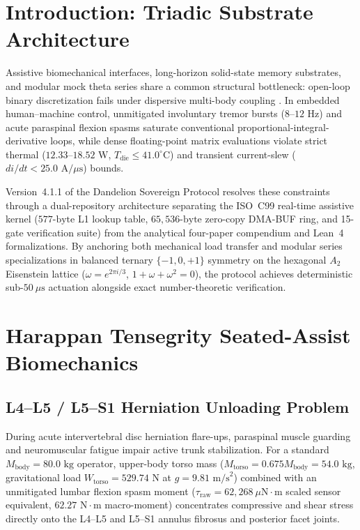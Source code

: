 \documentclass[aps,prl,twocolumn,superscriptaddress,10pt]{revtex4-2}
\begin{document}
\section{Introduction: Triadic Substrate Architecture}

Assistive biomechanical interfaces, long-horizon solid-state memory substrates, and modular mock theta series share a common structural bottleneck: open-loop binary discretization fails under dispersive multi-body coupling \cite{Landauer1961,Mori1965,Blume1966}. In embedded human--machine control, unmitigated involuntary tremor bursts ($8\text{--}12\text{ Hz}$) and acute paraspinal flexion spasms saturate conventional proportional-integral-derivative loops, while dense floating-point matrix evaluations violate strict thermal ($12.33\text{--}18.52\text{ W}$, $T_{\text{die}} \le 41.0^\circ\text{C}$) and transient current-slew ($di/dt < 25.0\text{ A}/\mu\text{s}$) bounds.

Version~4.1.1 of the Dandelion Sovereign Protocol resolves these constraints through a dual-repository architecture separating the ISO~C99 real-time assistive kernel ($577\text{-byte}$ L1 lookup table, $65,536\text{-byte}$ zero-copy DMA-BUF ring, and 15-gate verification suite) from the analytical four-paper compendium and Lean~4 formalizations. By anchoring both mechanical load transfer and modular series specializations in balanced ternary $\{-1, 0, +1\}$ symmetry on the hexagonal $A_2$ Eisenstein lattice ($\omega = e^{2\pi i/3}$, $1 + \omega + \omega^2 = 0$), the protocol achieves deterministic sub-$50\ \mu\text{s}$ actuation alongside exact number-theoretic verification.



\section{Harappan Tensegrity Seated-Assist Biomechanics}

\subsection{L4--L5 / L5--S1 Herniation Unloading Problem}

During acute intervertebral disc herniation flare-ups, paraspinal muscle guarding and neuromuscular fatigue impair active trunk stabilization. For a standard $M_{\text{body}} = 80.0\text{ kg}$ operator, upper-body torso mass ($M_{\text{torso}} = 0.675 M_{\text{body}} = 54.0\text{ kg}$, gravitational load $W_{\text{torso}} = 529.74\text{ N}$ at $g = 9.81\text{ m/s}^2$) combined with an unmitigated lumbar flexion spasm moment ($\tau_{\text{raw}} = 62,268\ \mu\text{N}\cdot\text{m}$ scaled sensor equivalent, $62.27\text{ N}\cdot\text{m}$ macro-moment) concentrates compressive and shear stress directly onto the L4--L5 and L5--S1 annulus fibrosus and posterior facet joints.
\end{document}
